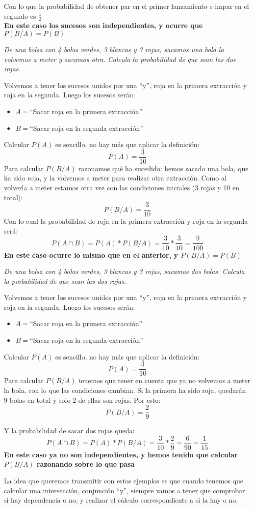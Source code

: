 \documentclass[a4paper,10pt,answers]{exam}
\begin{document}
\begin{questions}
\begin{solution}
Con lo que la probabilidad de obtener par en el primer lanzamiento e impar en el segundo es $\frac{1}{2}$\\
\textbf{En este caso los sucesos son independientes, y ocurre que $P(B/A) = P(B)$}
\end{solution}
\question\emph{De una bolsa con 4 bolas verdes, 3 blancas y 3 rojas, sacamos una bola la volvemos a meter y sacamos otra. Calcula la probabilidad de que sean las dos rojas.}
\begin{solution}
Volvemos a tener los sucesos unidos por una ``y'', roja en la primera extracción y roja en la segunda. Luego los sucesos serán:
\begin{itemize}
	\item $A=$``Sacar roja en la primera extracción''
	\item $B=$``Sacar roja en la segunda extracción''
\end{itemize}
Calcular $P(A)$ es sencillo, no hay más que aplicar la definición:
\[P(A)=\frac{3}{10}\]
Para calcular $P(B/A)$ razonamos qué ha sucedido: hemos sacado una bola, que ha sido roja, y la volvemos a meter para realizar otra extracción. Como al volverla a meter estamos otra vez con las condiciones iniciales (3 rojas y 10 en total):
\[P(B/A) = \frac{3}{10}\]
Con lo cual la probabilidad de  roja en la primera extracción y roja en la segunda será:
\[P(A \cap B) = P(A)*P(B/A) = \frac{3}{10} * \frac{3}{10} = \frac{9}{100}\]
\textbf{En este caso ocurre lo mismo que en el anterior, y $P(B/A) = P(B)$}
\end{solution}
\question\emph{De una bolsa con 4 bolas verdes, 3 blancas y 3 rojas, sacamos dos bolas. Calcula la probabilidad de que sean las dos rojas.}
\begin{solution}
Volvemos a tener los sucesos unidos por una ``y'', roja en la primera extracción y roja en la segunda. Luego los sucesos serán:
\begin{itemize}
	\item $A=$``Sacar roja en la primera extracción''
	\item $B=$``Sacar roja en la segunda extracción''
\end{itemize}
Calcular $P(A)$ es sencillo, no hay más que aplicar la definición:
\[P(A)=\frac{3}{10}\]
Para calcular $P(B/A)$ tenemos que tener en cuenta que ya no volvemos a meter la bola, con lo que las condiciones cambian. Si la primera ha sido roja, quedarán 9 bolas en total y solo 2 de ellas son rojas. Por esto:
\[P(B/A) = \frac{2}{9}\]

Y la probabilidad de sacar dos rojas queda:
\[P(A \cap B) = P(A)*P(B/A) = \frac{3}{10} * \frac{2}{9} = \frac{6}{90} = \frac{1}{15}\]
\textbf{En este caso ya no son independientes, y hemos tenido que calcular $P(B/A)$ razonando sobre lo que pasa}
\end{solution}
\end{questions}
La idea que queremos transmitir con estos ejemplos es que cuando tenemos que calcular una intersección, conjunción ``y'', siempre vamos a tener que comprobar si hay dependencia o no, y realizar el cálculo correspondiente a si la hay o no.
\end{document}

